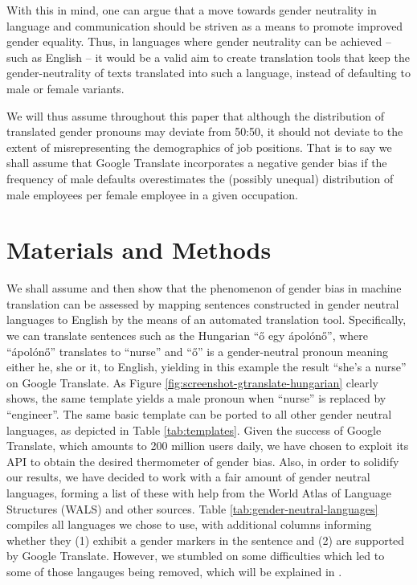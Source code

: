 \documentclass[twoside,11pt]{article}
\begin{document}
With this in mind, one can argue that a move towards gender neutrality in language and communication should be striven as a means to promote improved gender equality. Thus, in languages where gender neutrality can be achieved -- such as English -- it would be a valid aim to create translation tools that keep the gender-neutrality of texts translated into such a language, instead of defaulting to male or female variants.

We will thus assume throughout this paper that although the distribution of translated gender pronouns may deviate from 50:50, it should not deviate to the extent of misrepresenting the demographics of job positions. That is to say we shall assume that Google Translate incorporates a negative gender bias if the frequency of male defaults overestimates the (possibly unequal) distribution of male employees per female employee in a given occupation.

\section{Materials and Methods}

We shall assume and then show that the phenomenon of gender bias in machine translation can be assessed by mapping sentences constructed in gender neutral languages to English by the means of an automated translation tool. Specifically, we can translate sentences such as the Hungarian ``ő egy ápolónő'', where ``ápolónő'' translates to ``nurse'' and ``ő'' is a gender-neutral pronoun meaning either he, she or it, to English, yielding in this example the result ``she's a nurse'' on Google Translate. As Figure \ref{fig:screenshot-gtranslate-hungarian} clearly shows, the same template yields a male pronoun when ``nurse'' is replaced by ``engineer''. The same basic template can be ported to all other gender neutral languages, as depicted in Table \ref{tab:templates}. Given the success of Google Translate, which amounts to 200 million users daily, we have chosen to exploit its API to obtain the desired thermometer of gender bias. Also, in order to solidify our results, we have decided to work with a fair amount of gender neutral languages, forming a list of these with help from the World Atlas of Language Structures (WALS) \cite{wals} and other sources. Table \ref{tab:gender-neutral-languages} compiles all languages we chose to use, with additional columns informing whether they (1) exhibit a gender markers in the sentence and (2) are supported by Google Translate. However, we stumbled on some difficulties which led to some of those langauges being removed, which will be explained in . %
\end{document}
